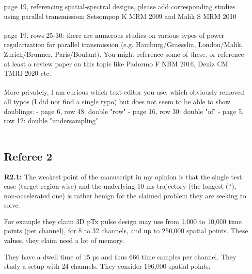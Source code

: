 \documentclass[11pt]{article}
\newcommand{\mysubsectionstar}[1]{\vspace{0mm}\subsection*{#1}\vspace{0mm}}
\begin{document}
 page 19, referencing spatial-spectral designs, please add corresponding studies using parallel transmission: Setsompop K MRM 2009 and Malik S MRM 2010
\\[0.2em]
\indent{\it \textcolor{blue}{We have added those citations, in both the Conclusion and Introduction.}}
\\[1.2em]

 page 19, rows 25-30: there are numerous studies on various types of power regularization for parallel transmission (e.g. Hamburg/Graesslin, London/Malik, Zurich/Brunner, Paris/Boulant). You might reference some of these, or reference at least a review paper on this topic like Padormo F NBM 2016, Deniz CM TMRI 2020 etc.
\\[0.2em]
\indent{\it \textcolor{blue}{We apologize; there were some references we intended to include there but missed in the initial submission.
In response to this and R2.2 and R2.3, we have added citations to the two review articles you mention, and also explicitly state that it is unclear at this time how and
whether hard constraints could be built in to the method.}}
\\[1.2em]

 More privately, I am curious which text editor you use, which obviously removed all typos (I did not find a single typo) but does not seem to be able to show doublings:
- page 6, row 48: double "row"
- page 16, row 30: double "of"
- page 5, row 12: double "undersampling"
\\[0.2em]
\indent{\it \textcolor{blue}{We used TexShop on the Mac - thanks for finding the doublings! 
We found and fixed the ``of'' doubling, 
and we removed the sentence containing the doubled ``undersampling'' to reduce word count, 
but we could not locate the ``row'' doubling.}}
\\[1.2em]

\mysubsectionstar{Referee 2}
{\bf R2.1:} The weakest point of the manuscript in my opinion is that the single test case (target region-wise) and the underlying 10 ms trajectory (the longest (?), non-accelerated one) is rather benign for the claimed problem they are seeking to solve.

For example they claim 3D pTx pulse design may use from 1,000 to 10,000 time points (per channel), for 8 to 32 channels, and up to 250,000 spatial points. These values, they claim need a lot of memory.

They have a dwell time of 15 µs and thus 666 time samples per channel.
They study a setup with 24 channels.
They consider 196,000 spatial points.
\end{document}
